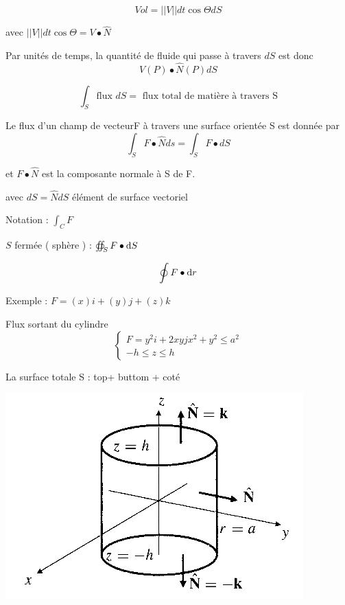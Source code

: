  \[Vol = ||V||dt \cos \Theta dS\]

 avec $||V||dt \cos \Theta = V\bullet \hat N$


 Par unités de temps, la quantité de fluide qui passe à travers $dS$ est donc \[V(P) \bullet \hat N(P) dS\]

 \[\int_S \text{flux } dS = \text{ flux total de matière à travers S}\]

 \begin{mydef}
 Le flux d'un champ de vecteurF  à travers une surface orientée S est donnée par\[\int_S F \bullet \hat N ds = \int_S F \bullet dS\]

 et $F \bullet \hat N$ est la composante normale à S de F.

 avec $dS = \hat N dS$ élément de surface vectoriel

 Notation : $\int_C F$
 \end{mydef}

\begin{myrem}

$S$ fermée ( sphère ) :  $ \oiint_S F\bullet \operatorname{d}\! S$

\[\oint F\bullet \operatorname{d}\! r\]

\end{myrem}

Exemple : $F = (x) i + (y) j+(z) k$

Flux sortant du cylindre
\[\left\{
\begin{array}{c}
F=y^2i+2xyjx^2+y^2\leqslant a^2 \\
-h\leqslant z \leqslant h
\end{array}
\right.\]


La surface totale S : top+ buttom + coté

\includegraphics[scale=0.5]{image10.png}

